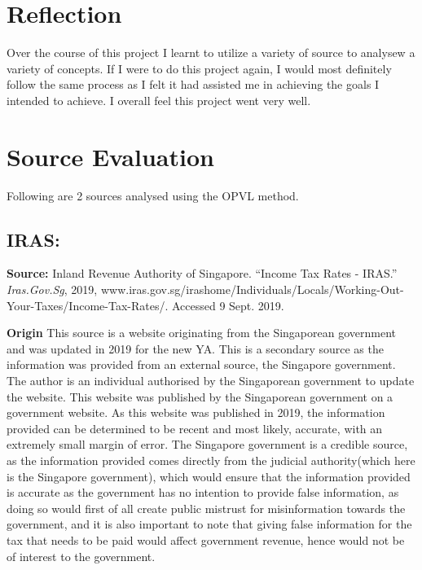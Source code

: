 \documentclass[12pt, a4paper]{article}
\begin{document}
	\section{Reflection}
		Over the course of this project I learnt to utilize a variety of source to analysew a variety of concepts. If I were to do this project again, I would most definitely follow the same process as I felt it had assisted me in achieving the goals I intended to achieve. I overall feel this project went very well.
	\section{Source Evaluation}
		Following are 2 sources analysed using the OPVL method.
		\subsection{IRAS:}
			\textbf{Source:}
			\newline
			Inland Revenue Authority of Singapore. “Income Tax Rates - IRAS.” \textit{Iras.Gov.Sg}, 2019, www.iras.gov.sg/irashome/Individuals/Locals/Working-Out-Your-Taxes/Income-Tax-Rates/. Accessed 9 Sept. 2019.
			\newline
			
			\textbf{Origin}
			\newline
			This source is a website originating from the Singaporean government and was updated in 2019 for the new YA. This is a secondary source as the information was provided from an external source, the Singapore government. The author is an individual authorised by the Singaporean government to update the website. This website was published by the Singaporean government on a  government website. As this website was published in 2019, the information provided can be determined to be recent and most likely, accurate, with an extremely small margin of error. The Singapore government is a credible source, as the information provided comes directly from the judicial authority(which here is the Singapore government), which would ensure that the information provided is accurate as the government has no intention to provide false information, as doing so would first of all create  public mistrust for misinformation towards the government, and it is also important to note that giving false information for the tax that needs to be paid would affect government revenue, hence would not be of interest to the government.  
			\newline
		
\end{document}
